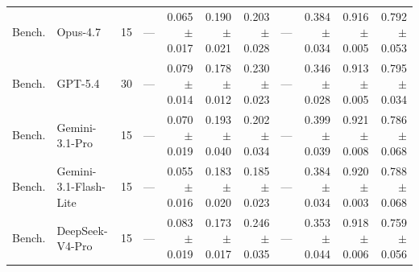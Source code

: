 \begin{table}[t]
{\begin{tabular}{llrrrrrrrrr}
Bench. & Opus-4.7 & 15 & --- & \shortstack[r]{0.065\\{\scriptsize $\pm$0.017}} & \shortstack[r]{0.190\\{\scriptsize $\pm$0.021}} & \shortstack[r]{0.203\\{\scriptsize $\pm$0.028}} & --- & \shortstack[r]{0.384\\{\scriptsize $\pm$0.034}} & \shortstack[r]{0.916\\{\scriptsize $\pm$0.005}} & \shortstack[r]{0.792\\{\scriptsize $\pm$0.053}} \\
Bench. & GPT-5.4 & 30 & --- & \shortstack[r]{0.079\\{\scriptsize $\pm$0.014}} & \shortstack[r]{0.178\\{\scriptsize $\pm$0.012}} & \shortstack[r]{0.230\\{\scriptsize $\pm$0.023}} & --- & \shortstack[r]{0.346\\{\scriptsize $\pm$0.028}} & \shortstack[r]{0.913\\{\scriptsize $\pm$0.005}} & \shortstack[r]{0.795\\{\scriptsize $\pm$0.034}} \\
Bench. & Gemini-3.1-Pro & 15 & --- & \shortstack[r]{0.070\\{\scriptsize $\pm$0.019}} & \shortstack[r]{0.193\\{\scriptsize $\pm$0.040}} & \shortstack[r]{0.202\\{\scriptsize $\pm$0.034}} & --- & \shortstack[r]{0.399\\{\scriptsize $\pm$0.039}} & \shortstack[r]{0.921\\{\scriptsize $\pm$0.008}} & \shortstack[r]{0.786\\{\scriptsize $\pm$0.068}} \\
Bench. & Gemini-3.1-Flash-Lite & 15 & --- & \shortstack[r]{0.055\\{\scriptsize $\pm$0.016}} & \shortstack[r]{0.183\\{\scriptsize $\pm$0.020}} & \shortstack[r]{0.185\\{\scriptsize $\pm$0.023}} & --- & \shortstack[r]{0.384\\{\scriptsize $\pm$0.034}} & \shortstack[r]{0.920\\{\scriptsize $\pm$0.003}} & \shortstack[r]{0.788\\{\scriptsize $\pm$0.068}} \\
Bench. & DeepSeek-V4-Pro & 15 & --- & \shortstack[r]{0.083\\{\scriptsize $\pm$0.019}} & \shortstack[r]{0.173\\{\scriptsize $\pm$0.017}} & \shortstack[r]{0.246\\{\scriptsize $\pm$0.035}} & --- & \shortstack[r]{0.353\\{\scriptsize $\pm$0.044}} & \shortstack[r]{0.918\\{\scriptsize $\pm$0.006}} & \shortstack[r]{0.759\\{\scriptsize $\pm$0.056}} \\

\end{tabular}}
\end{table}
